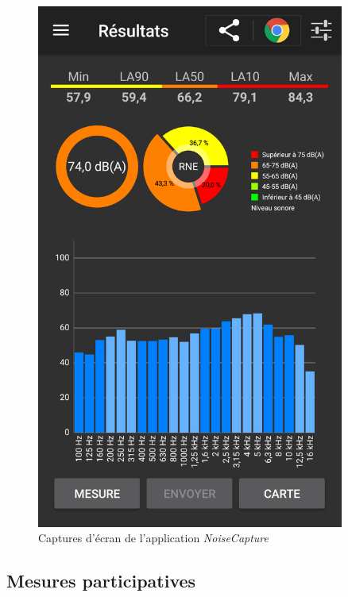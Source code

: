 \begin{figure}[t]
\begin{center}
\begin{minipage}[t]{0.3\textwidth}
        \includegraphics[width=0.9\textwidth]{./figures/autres/noiseCapture2.png}
    \end{minipage}
    \caption{Captures d'écran de l'application \textit{NoiseCapture}}
\end{center}
    \label{fig:noiseCapture}
\end{figure}

\subsection{Mesures participatives}


